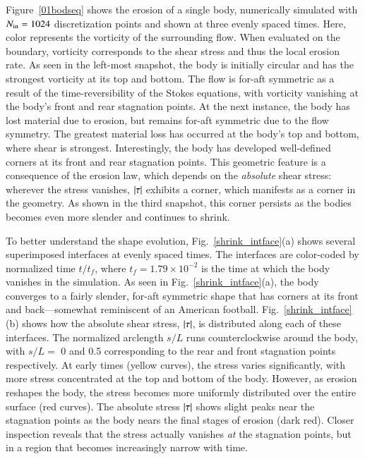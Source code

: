 \documentclass[preprint, 10pt]{elsarticle}
\begin{document}
Figure~\ref{01bodseq} shows the erosion of a single body, numerically simulated with $N_{\mathrm{in}} = 1024$ discretization points and shown at three evenly spaced times. Here, color represents the vorticity of the surrounding flow. When evaluated on the boundary, vorticity corresponds to the shear stress and thus the local erosion rate. As seen in the left-most snapshot, the body is initially circular and has the strongest vorticity at its top and bottom. The flow is for-aft symmetric as a result of the time-reversibility of the Stokes equations, with vorticity vanishing at the body's front and rear stagnation points. At the next instance, the body has lost material due to erosion, but remains for-aft symmetric due to the flow symmetry. The greatest material loss has occurred at the body's top and bottom, where shear is strongest. Interestingly, the body has developed well-defined corners at its front and rear stagnation points. This geometric feature is a consequence of the erosion law, which depends on the {\em absolute} shear stress: wherever the stress vanishes, $\lvert \tau \rvert$ exhibits a corner, which manifests as a corner in the geometry. As shown in the third snapshot, this corner persists as the bodies becomes even more slender and continues to shrink.  

To better understand the shape evolution, Fig.~\ref{shrink_intface}(a) shows several superimposed interfaces at evenly spaced times. The interfaces are color-coded by normalized time $t/t_f$, where $t_f = 1.79 \times 10^{-2}$ is the time at which the body vanishes in the simulation. As seen in Fig.~\ref{shrink_intface}(a), the body converges to a fairly slender, for-aft symmetric shape that has corners at its front and back---somewhat reminiscent of an American football.  Fig.~\ref{shrink_intface}(b) shows how the absolute shear stress, $\lvert \tau \rvert$, is distributed along each of these interfaces. The normalized arclength $s/L$ runs counterclockwise around the body, with $s/L = $ 0 and 0.5 corresponding to the rear and front stagnation points respectively. At early times (yellow curves), the stress varies significantly, with more stress concentrated at the top and bottom of the body. However, as erosion reshapes the body, the stress becomes more uniformly distributed over the entire surface (red curves). The absolute stress $\lvert \tau \rvert$ shows slight peaks near the stagnation points as the body nears the final stages of erosion (dark red). Closer inspection reveals that the stress actually vanishes {\em at} the stagnation points, but in a region that becomes increasingly narrow with time.
\end{document}

